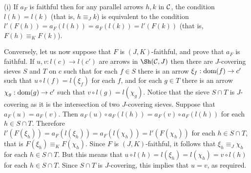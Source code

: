 \documentclass[a4paper,12pt]{article}
\begin{document}
\begin{proofs}
	(i) If $a_{F}$ is faithful then for any parallel arrows $h, k$ in $\cal C$, the condition $l(h)=l(k)$ (that is, $h\equiv_{J} k$) is equivalent to the condition $l'(F(h))=a_{F}(l(h))=a_{F}(l(k))=l'(F(k))$ (that is, $F(h)\equiv_{K} F(k)$). 
	
	Conversely, let us now suppose that $F$ is $(J, K)$-faithful, and prove that $a_{F}$ is faithful. If $u, v:l(c)\to l(c')$ are arrows in $\Sh({\cal C}, J)$ then there are $J$-covering sieves $S$ and $T$ on $c$ such that for each $f\in S$ there is an arrow $\xi_{f}:\textup{dom}(f)\to c'$ such that $u\circ l(f)=l(\xi_{f})$ for each $f$, and for each $g\in T$ there is an arrow $\chi_{g}:\textup{dom}(g)\to c'$ such that $v\circ l(g)=l(\chi_{g})$. Notice that the sieve $S\cap T$ is $J$-covering as it is the intersection of two $J$-covering sieves. Suppose that $a_{F}(u)=a_{F}(v)$. Then $a_{F}(u)\circ a_{F}(l(h))=a_{F}(v)\circ a_{F}(l(h))$ for each $h\in S\cap T$. Therefore $l'(F(\xi_{h}))= a_{F}(l(\xi_{h}))=a_{F}(l(\chi_{h}))=l'(F(\chi_{h}))$ for each $h\in S\cap T$, that is $F(\xi_{h}) \equiv_{K} F(\chi_{h})$. Since $F$ is $(J, K)$-faithful, it follows that $\xi_{h}\equiv_{J} \chi_{h}$ for each $h\in S\cap T$. But this means that $u\circ l(h)=l(\xi_{h})=l(\chi_{h})=v\circ l(h)$ for each $h\in S\cap T$. Since $S\cap T$ is $J$-covering, this implies that $u=v$, as required.        
	

\end{proofs}
\end{document}
